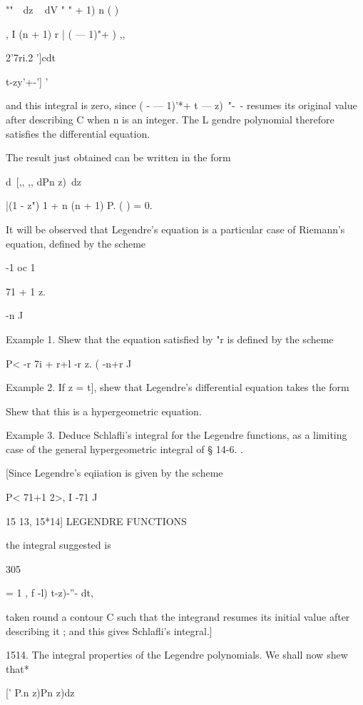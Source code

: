   ""~~dz ~ dV " " + 1) n ( )

, I (n + 1) r | ( — 1)"+ ) ,,

  2'7ri.2 ']cdt\ \ {t-zy'+-'] '

and this integral is zero, since ( - — 1)'*+ t — z)~"-~- resumes its
original value after describing C when n is an integer. The L gendre
polynomial therefore satisfies the differential equation.

The result just obtained can be written in the form

d\ [,, ,, dPn z)\ dz



|(1 - z") 1 + n (n + 1) P. ( ) = 0.



It will be observed that Legendre's equation is a particular case of
Riemann's equation, defined by the scheme

-1 oc 1

71 + 1 z.

-n J

Example 1. Shew that the equation satisfied by "r is defined by the
scheme

P< -r 7i + r+l -r z. ( -n+r J

Example 2. If z = t], shew that Legendre's differential equation takes
the form






Shew that this is a hypergeometric equation.

Example 3. Deduce Schlafli's integral for the Legendre functions, as a
limiting case of the general hypergeometric integral of § 14-6. .

[Since Legendre's eqiiation is given by the scheme

P< 71+1 2>, I -71 J



15 13, 15*14] LEGENDRE FUNCTIONS

the integral suggested is



305



= 1 , f -l) t-z)-''- dt,

taken round a contour C such that the integrand resumes its initial
value after describing it ; and this gives Schlafli's integral.]

1514. The integral properties of the Legendre polynomials. We shall
now shew that*



[' P.n z)Pn z)dz

}
